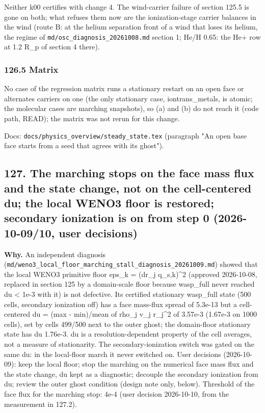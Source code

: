 \documentclass[english,a4paper]{my_memo}
\begin{document}
Neither k00 certifies with change 4. The wind-carrier failure of section 125.5 is gone on both; what refuses them now are the ionization-stage carrier balances in the wind (route B: at the helium separation front of a wind that loses its helium, the regime of \texttt{md/osc\_diagnosis\_20261008.md} section 1; He/H 0.65: the He+ row at 1.2 R\_p of section 4 there).

\subsubsection{126.5 Matrix}\label{1265-matrix}

No case of the regression matrix runs a stationary restart on an open face or alternates carriers on one (the only stationary case, iontrans\_metals, is atomic; the molecular cases are marching snapshots), so (a) and (b) do not reach it (code path, READ); the matrix was not rerun for this change.

Docs: \texttt{docs/physics\_overview/steady\_state.tex} (paragraph "An open base face starts from a seed that agrees with its ghost").

\subsection{127. The marching stops on the face mass flux and the state change, not on the cell-centered du; the local WENO3 floor is restored; secondary ionization is on from step 0 (2026-10-09/10, user decisions)}\label{127-the-marching-stops-on-the-face-mass-flux-and-the-state-change-not-on-the-cell-centered-du-the-local-weno3-floor-is-restored-secondary-ionization-is-on-from-step-0-2026-10-0910-user-decisions}

\textbf{Why.} An independent diagnosis (\texttt{md/weno3\_local\_floor\_marching\_stall\_diagnosis\_20261009.md})
showed that the local WENO3 primitive floor eps\_k = (dr\_j q\_s,k)\^{}2 (approved
2026-10-08, replaced in section 125 by a domain-scale floor because wasp\_full
never reached du \textless{} 1e-3 with it) is not defective. Its certified stationary
wasp\_full state (500 cells, secondary ionization off) has a face mass-flux
spread of 5.3e-13 but a cell-centered du = (max - min)/mean of rho\_j v\_j r\_j\^{}2
of 3.57e-3 (1.67e-3 on 1000 cells), set by cells 499/500 next to the outer
ghost; the domain-floor stationary state has du 1.76e-3. du is a
resolution-dependent property of the cell averages, not a measure of
stationarity. The secondary-ionization switch was gated on the same du: in the
local-floor march it never switched on. User decisions (2026-10-09): keep the
local floor; stop the marching on the numerical face mass flux and the state
change, du kept as a diagnostic; decouple the secondary ionization from du;
review the outer ghost condition (design note only, below). Threshold of the
face flux for the marching stop: 4e-4 (user decision 2026-10-10, from the
measurement in 127.2).
\end{document}
